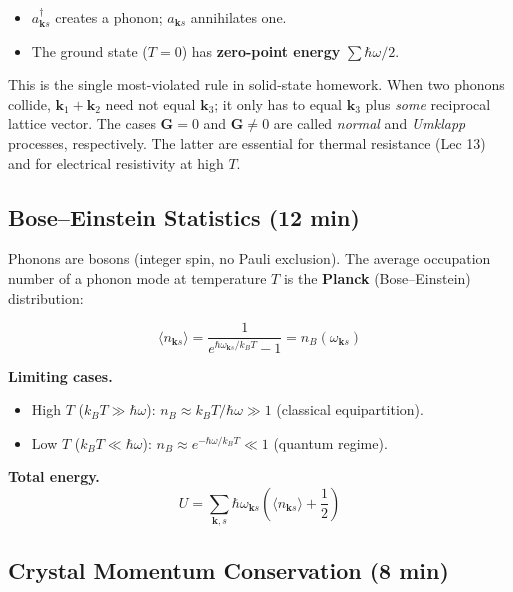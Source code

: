 \documentclass[11pt,a4paper]{article}
\begin{document}
\begin{physbox}
\begin{itemize}
\item $a^\dagger_{\mathbf k s}$ creates a phonon; $a_{\mathbf k s}$ annihilates one.
\item The ground state ($T=0$) has \textbf{zero-point energy} $\sum \hbar\omega/2$.
\end{itemize}
\end{physbox}

\begin{pitbox}
This is the single most-violated rule in solid-state homework. When two phonons
collide, $\mathbf k_1+\mathbf k_2$ need not equal $\mathbf k_3$; it only has to
equal $\mathbf k_3$ plus \emph{some} reciprocal lattice vector. The cases $\mathbf G=0$
and $\mathbf G\ne0$ are called \emph{normal} and \emph{Umklapp} processes,
respectively. The latter are essential for thermal resistance (Lec 13) and for
electrical resistivity at high $T$.
\end{pitbox}

\subsection{Bose--Einstein Statistics \hfill \small(12 min)}

Phonons are bosons (integer spin, no Pauli exclusion). The average occupation number
of a phonon mode at temperature $T$ is the \textbf{Planck} (Bose--Einstein)
distribution:
\begin{keybox}
\[
\langle n_{\mathbf k s}\rangle = \frac{1}{e^{\hbar\omega_{\mathbf ks}/k_BT}-1} = n_B(\omega_{\mathbf k s})
\]
\end{keybox}

\textbf{Limiting cases.}
\begin{itemize}
\item High $T$ ($k_BT\gg\hbar\omega$): $n_B\approx k_BT/\hbar\omega \gg 1$ (classical equipartition).
\item Low $T$ ($k_BT\ll\hbar\omega$): $n_B\approx e^{-\hbar\omega/k_BT}\ll 1$ (quantum regime).
\end{itemize}

\textbf{Total energy.}
\[
U = \sum_{\mathbf k,s}\hbar\omega_{\mathbf k s}\left(\langle n_{\mathbf ks}\rangle+\frac12\right)
\]

\subsection{Crystal Momentum Conservation \hfill \small(8 min)}
\end{document}
